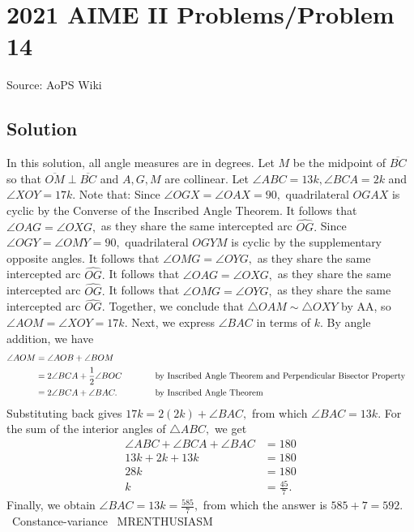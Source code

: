 \documentclass[12pt]{article}
\begin{document}
\section*{{2021 AIME II Problems/Problem 14}}
Source: AoPS Wiki

\subsection*{Solution}
In this solution, all angle measures are in degrees. Let $M$ be the midpoint of $\overline{BC}$ so that $\overline{OM}\perp\overline{BC}$ and $A,G,M$ are collinear. Let $\angle ABC=13k,\angle BCA=2k$ and $\angle XOY=17k.$ Note that: Since $\angle OGX = \angle OAX = 90,$ quadrilateral $OGAX$ is cyclic by the Converse of the Inscribed Angle Theorem. It follows that $\angle OAG = \angle OXG,$ as they share the same intercepted arc $\widehat{OG}.$ Since $\angle OGY = \angle OMY = 90,$ quadrilateral $OGYM$ is cyclic by the supplementary opposite angles. It follows that $\angle OMG = \angle OYG,$ as they share the same intercepted arc $\widehat{OG}.$ It follows that $\angle OAG = \angle OXG,$ as they share the same intercepted arc $\widehat{OG}.$ It follows that $\angle OMG = \angle OYG,$ as they share the same intercepted arc $\widehat{OG}.$ Together, we conclude that $\triangle OAM \sim \triangle OXY$ by AA, so $\angle AOM = \angle XOY = 17k.$ Next, we express $\angle BAC$ in terms of $k.$ By angle addition, we have \begin{align*} \angle AOM &= \angle AOB + \angle BOM \\ &= 2\angle BCA + \frac12\angle BOC \hspace{10mm} &&\text{by Inscribed Angle Theorem and Perpendicular Bisector Property} \\ &= 2\angle BCA + \angle BAC. &&\text{by Inscribed Angle Theorem} \end{align*} Substituting back gives $17k=2(2k)+\angle BAC,$ from which $\angle BAC=13k.$ For the sum of the interior angles of $\triangle ABC,$ we get \begin{align*} \angle ABC + \angle BCA + \angle BAC &= 180 \\ 13k+2k+13k&=180 \\ 28k&=180 \\ k&=\frac{45}{7}. \end{align*} Finally, we obtain $\angle BAC=13k=\frac{585}{7},$ from which the answer is $585+7=\boxed{592}.$ ~Constance-variance ~MRENTHUSIASM
\end{document}

